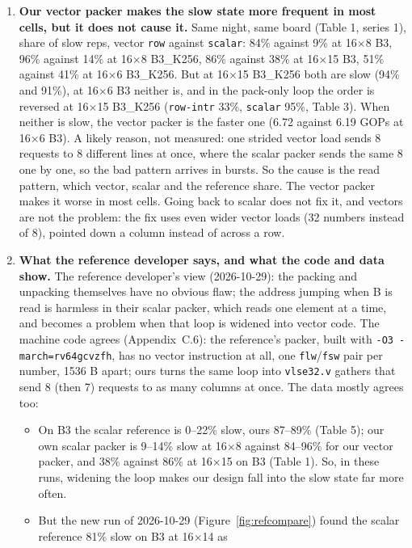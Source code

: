 \documentclass[10pt,a4paper]{article}
\begin{document}
\begin{enumerate}
  \item \textbf{Our vector packer makes the slow state more frequent in most cells, but it does not cause it.} Same night, same board
  (Table 1, series 1), share of slow reps, vector \texttt{row} against \texttt{scalar}: 84\% against 9\% at 16$\times$8 B3, 96\% against
  14\% at 16$\times$8 B3\_K256, 86\% against 38\% at 16$\times$15 B3, 51\% against 41\% at 16$\times$6 B3\_K256. But at 16$\times$15
  B3\_K256 both are slow (94\% and 91\%), at 16$\times$6 B3 neither is, and in the pack-only loop the order is reversed at 16$\times$15
  B3\_K256 (\texttt{row-intr} 33\%, \texttt{scalar} 95\%, Table 3). When neither is slow, the vector packer is the faster one (6.72
  against 6.19 GOPs at 16$\times$6 B3). A likely reason, not measured: one strided vector load sends 8 requests to 8 different lines at
  once, where the scalar packer sends the same 8 one by one, so the bad pattern arrives in bursts. So the cause is the read pattern,
  which vector, scalar and the reference share. The vector packer makes it worse in most cells. Going back to scalar does not fix it,
  and vectors are not the problem: the fix uses even wider vector loads (32 numbers instead of 8), pointed down a column instead of
  across a row.
  \item \textbf{What the reference developer says, and what the code and data show.} The reference developer's view (2026-10-29):
  the packing and unpacking themselves have no obvious flaw; the address jumping when B is read is harmless in their scalar packer,
  which reads one element at a time, and becomes a problem when that loop is widened into vector code. The machine code agrees
  (Appendix~C.6): the reference's packer, built with \texttt{-O3 -march=rv64gcvzfh}, has no vector instruction at all, one
  \texttt{flw}/\texttt{fsw} pair per number, 1536 B apart; ours turns the same loop into \texttt{vlse32.v} gathers that send 8 (then 7)
  requests to as many columns at once. The data mostly agrees too:
  \begin{itemize}
    \item On B3 the scalar reference is 0--22\% slow, ours 87--89\% (Table 5); our own scalar packer is 9--14\% slow at 16$\times$8
    against 84--96\% for our vector packer, and 38\% against 86\% at 16$\times$15 on B3 (Table 1). So, in these runs, widening the
    loop makes our design fall into the slow state far more often.
    \item But the new run of 2026-10-29 (Figure~\ref{fig:refcompare}) found the scalar reference 81\% slow on B3 at 16$\times$14 as

\end{itemize}
\end{enumerate}
\end{document}
